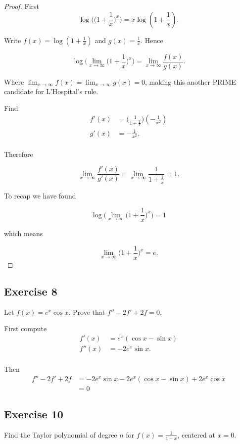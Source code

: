 \documentclass{tufte-book}
\theoremstyle{mytheoremstyle}
\theoremstyle{mylemstyle}
\theoremstyle{mydefstyle}
\begin{document}
\begin{proof}

First
\[ \log \Big( \big(1 + \frac{1}{x}\big)^x \Big) = x \log(1 + \frac{1}{x}). \]

Write $f(x) = \log(1 + \frac{1}{x})$ and $g(x) = \frac{1}{x}$. Hence

\[ \log\Big(\lim_{x \to \infty} \Big( 1 + \frac{1}{x} \Big)^x \Big) = \lim_{x \to \infty}\frac{f(x)}{g(x)}. \]

Where $\lim_{x \to \infty}f(x) = \lim_{x \to \infty}g(x) = 0$, making this another PRIME candidate for L'Hospital's rule.

Find
\begin{align*}
f'(x) &= \big(\frac{1}{1+\frac{1}{x}}\big)(-\frac{1}{x^2}) \\
g'(x) &= -\frac{1}{x^2}. \\
\end{align*}

Therefore

\[ \lim_{x \to \infty} \frac{f'(x)}{g'(x)} = \lim_{x \to \infty} \frac{1}{1 + \frac{1}{x}} = 1. \]

To recap we have found

\[ \log\Big(\lim_{x \to \infty} \Big( 1 + \frac{1}{x} \Big)^x \Big) = 1 \]

which means

\[ \lim_{x \to \infty} \Big( 1 + \frac{1}{x} \Big)^x = e.\]

\end{proof}

\subsection{Exercise 8}
Let $f(x) = e^x \cos x$.  Prove that $f'' - 2f' + 2f =0$.

First compute
\begin{align*}
f'(x) &= e^x(\cos x - \sin x) \\
f''(x) &= -2e^x \sin x.\\
\end{align*}

Then
\begin{align*}
f'' - 2f' + 2f &= -2e^x \sin x - 2e^x(\cos x - \sin x) + 2e^x \cos x \\
&= 0
\end{align*}

\subsection{Exercise 10}
Find the Taylor polynomial of degree $n$ for $f(x) = \frac{1}{1-x}$, centered at $x=0$.
\end{document}
